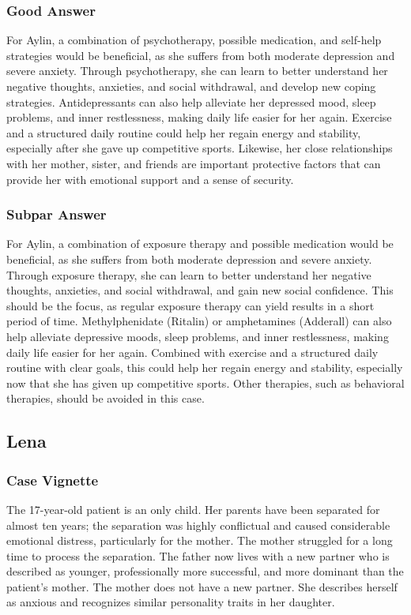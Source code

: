 \documentclass[sigconf,natbib=false]{acmart}
\begin{document}
\subsubsection{Good Answer}
For Aylin, a combination of psychotherapy, possible medication, and self-help strategies would be beneficial, as she suffers from both moderate depression and severe anxiety.
Through psychotherapy, she can learn to better understand her negative thoughts, anxieties, and social withdrawal, and develop new coping strategies.
Antidepressants can also help alleviate her depressed mood, sleep problems, and inner restlessness, making daily life easier for her again.
Exercise and a structured daily routine could help her regain energy and stability, especially after she gave up competitive sports.
Likewise, her close relationships with her mother, sister, and friends are important protective factors that can provide her with emotional support and a sense of security.
\subsubsection{Subpar Answer}
For Aylin, a combination of exposure therapy and possible medication would be beneficial, as she suffers from both moderate depression and severe anxiety.
Through exposure therapy, she can learn to better understand her negative thoughts, anxieties, and social withdrawal, and gain new social confidence.
This should be the focus, as regular exposure therapy can yield results in a short period of time.
Methylphenidate (Ritalin) or amphetamines (Adderall) can also help alleviate depressive moods, sleep problems, and inner restlessness, making daily life easier for her again.
Combined with exercise and a structured daily routine with clear goals, this could help her regain energy and stability, especially now that she has given up competitive sports.
Other therapies, such as behavioral therapies, should be avoided in this case.

\subsection{Lena \autocite[slide~26]{dbjr_stoerungsbilder}}
\label{app:LenaFull}
\subsubsection{Case Vignette}
The 17-year-old patient is an only child.
Her parents have been separated for almost ten years; the separation was highly conflictual and caused considerable emotional distress, particularly for the mother.
The mother struggled for a long time to process the separation.
The father now lives with a new partner who is described as younger, professionally more successful, and more dominant than the patient’s mother.
The mother does not have a new partner.
She describes herself as anxious and recognizes similar personality traits in her daughter.
\end{document}

